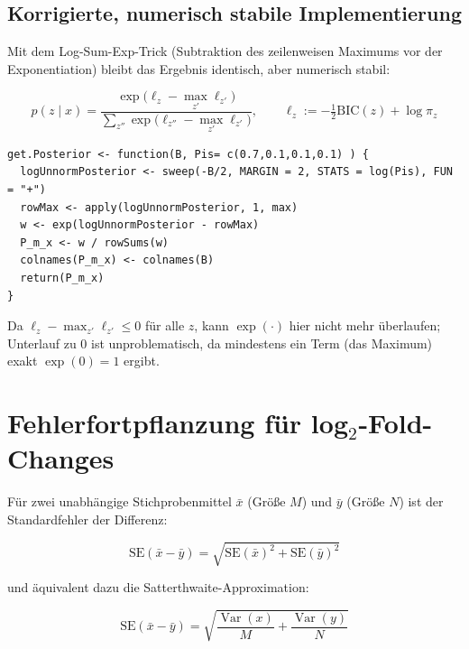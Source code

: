 \documentclass[11pt,a4paper]{article}
\begin{document}
\subsection{Korrigierte, numerisch stabile Implementierung}

Mit dem Log-Sum-Exp-Trick (Subtraktion des zeilenweisen Maximums vor der
Exponentiation) bleibt das Ergebnis identisch, aber numerisch stabil:

\begin{equation}
p(z\mid x) = \frac{\exp\!\big(\ell_z - \max_{z'}\ell_{z'}\big)}
                   {\sum_{z''}\exp\!\big(\ell_{z''} - \max_{z'}\ell_{z'}\big)},
\qquad \ell_z := -\tfrac12\text{BIC}(z) + \log \pi_z
\label{eq:posterior-stable}
\end{equation}

\begin{lstlisting}
get.Posterior <- function(B, Pis= c(0.7,0.1,0.1,0.1) ) {
  logUnnormPosterior <- sweep(-B/2, MARGIN = 2, STATS = log(Pis), FUN = "+")
  rowMax <- apply(logUnnormPosterior, 1, max)
  w <- exp(logUnnormPosterior - rowMax)
  P_m_x <- w / rowSums(w)
  colnames(P_m_x) <- colnames(B)
  return(P_m_x)
}
\end{lstlisting}

Da $\ell_z - \max_{z'}\ell_{z'} \le 0$ für alle $z$, kann $\exp(\cdot)$ hier
nicht mehr überlaufen; Unterlauf zu $0$ ist unproblematisch, da mindestens
ein Term (das Maximum) exakt $\exp(0)=1$ ergibt.

\section{Fehlerfortpflanzung für log$_2$-Fold-Changes}
\label{sec:log2fc}

Für zwei unabhängige Stichprobenmittel $\bar x$ (Größe $M$) und $\bar y$
(Größe $N$) ist der Standardfehler der Differenz:

\begin{equation}
\text{SE}(\bar x - \bar y) = \sqrt{\text{SE}(\bar x)^2 + \text{SE}(\bar y)^2}
\label{eq:se-diff}
\end{equation}

und äquivalent dazu die Satterthwaite-Approximation:

\begin{equation}
\text{SE}(\bar x - \bar y) = \sqrt{\frac{\operatorname{Var}(x)}{M} + \frac{\operatorname{Var}(y)}{N}}
\label{eq:satterthwaite}
\end{equation}
\end{document}
